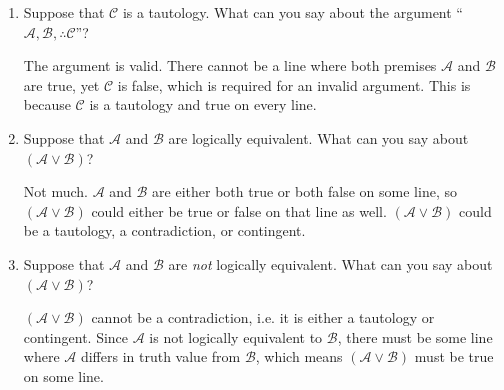 \documentclass[12pt, letterpaper, twoside]{article}
\begin{document}
\begin{enumerate}
	\item Suppose that $\mathcal{C}$ is a
          tautology. What can you say about the argument
          ``$\mathcal{A}, \mathcal{B},
          \therefore\mathcal{C}$''?

	The argument is valid. There cannot be a line where
        both premises $\mathcal{A}$ and $\mathcal{B}$ are
        true, yet $\mathcal{C}$ is false, which is required
        for an invalid argument. This is because
        $\mathcal{C}$ is a tautology and true on every line.

	\item Suppose that $\mathcal{A}$ and $\mathcal{B}$
          are logically equivalent. What can you say about
          $(\mathcal{A}\vee\mathcal{B})$?

	Not much. $\mathcal{A}$ and $\mathcal{B}$ are either
        both true or both false on some line, so
        $(\mathcal{A}\vee\mathcal{B})$ could either be true
        or false on that line as well.
        $(\mathcal{A}\vee\mathcal{B})$ could be a tautology,
        a contradiction, or contingent.

	\item Suppose that $\mathcal{A}$ and $\mathcal{B}$
          are \emph{not} logically equivalent. What can you
          say about $(\mathcal{A}\vee\mathcal{B})$?

	$(\mathcal{A}\vee\mathcal{B})$ cannot be a
          contradiction, i.e.  it is either a tautology or
          contingent. Since $\mathcal{A}$ is not logically
          equivalent to $\mathcal{B}$, there must be some
          line where $\mathcal{A}$ differs in truth value
          from $\mathcal{B}$, which means
          $(\mathcal{A}\vee\mathcal{B})$ must be true on
          some line.
\end{enumerate}
\end{document}
